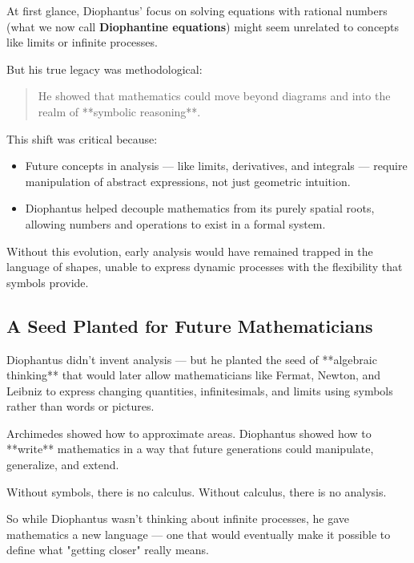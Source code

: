 At first glance, Diophantus’ focus on solving equations with rational numbers (what we now call \textbf{Diophantine equations}) might seem unrelated to concepts like limits or infinite processes.

But his true legacy was methodological:

\begin{quote}
He showed that mathematics could move beyond diagrams and into the realm of **symbolic reasoning**.
\end{quote}

This shift was critical because:

\begin{itemize}
  \item Future concepts in analysis — like limits, derivatives, and integrals — require manipulation of abstract expressions, not just geometric intuition.
  \item Diophantus helped decouple mathematics from its purely spatial roots, allowing numbers and operations to exist in a formal system.
\end{itemize}

Without this evolution, early analysis would have remained trapped in the language of shapes, unable to express dynamic processes with the flexibility that symbols provide.

\subsection{A Seed Planted for Future Mathematicians}

Diophantus didn’t invent analysis — but he planted the seed of **algebraic thinking** that would later allow mathematicians like Fermat, Newton, and Leibniz to express changing quantities, infinitesimals, and limits using symbols rather than words or pictures.

\begin{tcolorbox}[colback=blue!5!white, colframe=blue!50!black, title={Diophantus: The Forgotten Architect of Abstract Thinking}]
Archimedes showed how to approximate areas.  
Diophantus showed how to **write** mathematics in a way that future generations could manipulate, generalize, and extend.

Without symbols, there is no calculus.  
Without calculus, there is no analysis.
\end{tcolorbox}

So while Diophantus wasn’t thinking about infinite processes, he gave mathematics a new language — one that would eventually make it possible to define what "getting closer" really means.

